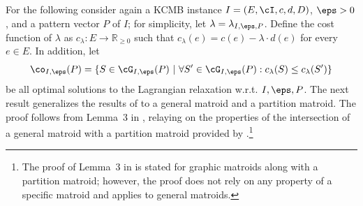 For the following consider again a KCMB instance $I = (E,\cI,c,d,D)$, $\eps>0$, and a pattern vector $P$ of $I$; for simplicity, let $\lambda = 	\lambda_{I,\eps,P} $. Define the cost function of $\lambda$ as $c_{\lambda} : E \rightarrow \mathbb{R}_{\geq 0}$ such that $c_{\lambda}(e) = c(e)-\lambda \cdot d(e)$ for every $e \in E$. In addition, let $$\co_{I,\eps}(P) = \{S \in\cG_{I,\eps}(P)~|~\forall S' \in \cG_{I,\eps}(P) : c_{\lambda}(S) \leq c_{\lambda}(S')\}$$ be all optimal solutions to the Lagrangian relaxation w.r.t. $I,\eps,P$. %
The next result generalizes the results of \cite{hassin2004efficient,frederickson1989algorithms,ravi1996constrained} to a general matroid and a partition matroid. The proof  follows from Lemma~3 in \cite{hassin2004efficient}, relaying on the properties of the intersection of a general matroid with a partition matroid provided by \cite{brezovec1988matroid}.\footnote{The proof of Lemma~3 in \cite{hassin2004efficient} is stated for graphic matroids along with a partition matroid; however, the proof does not rely on any property of a specific matroid and applies to general matroids.}
%	


